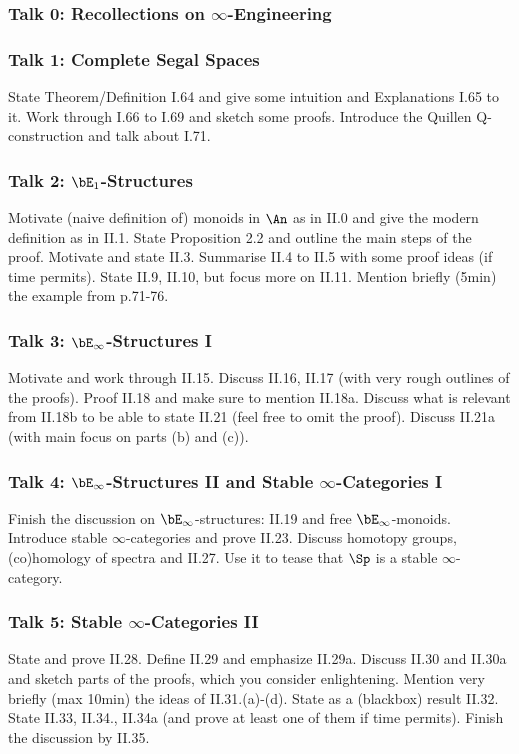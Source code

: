 \documentclass{article}
\begin{document}
\subsubsection*{Talk 0: Recollections on $\infty$-Engineering}


\subsubsection*{Talk 1: Complete Segal Spaces}
State Theorem/Definition I.64 and give some intuition and
Explanations I.65 to it.
Work through I.66 to I.69 and sketch some proofs.
Introduce the Quillen Q-construction and talk about I.71.

\subsubsection*{Talk 2: $\bE_1$-Structures}
Motivate (naive definition of) monoids in $\An$ as in II.0 and
give the modern definition as in II.1. State Proposition 2.2 and 
outline the main steps of the proof.
Motivate and state II.3. Summarise II.4 to II.5 with some proof ideas
(if time permits). State II.9, II.10, but focus more on II.11.
Mention briefly (5min) the example from p.71-76.


\subsubsection*{Talk 3: $\bE_\infty$-Structures I}
Motivate and work through II.15. Discuss II.16, II.17 (with very rough outlines
of the proofs). Proof II.18 and make sure to mention II.18a.
Discuss what is relevant from II.18b to be able to state II.21
(feel free to omit the proof). Discuss II.21a (with main focus on parts 
(b) and (c)).

\subsubsection*{Talk 4: $\bE_\infty$-Structures II and 
Stable $\infty$-Categories I}
Finish the discussion on $\bE_\infty$-structures: II.19 and free 
$\bE_\infty$-monoids.
Introduce stable $\infty$-categories and prove II.23. Discuss
homotopy groups, (co)homology of spectra and II.27. Use it to 
tease that $\Sp$ is a stable $\infty$-category.

\subsubsection*{Talk 5: Stable $\infty$-Categories II}
State and prove II.28. Define II.29 and emphasize II.29a.
Discuss II.30 and II.30a and sketch parts of the proofs, which you consider
enlightening. Mention very briefly (max 10min) the ideas of II.31.(a)-(d).
State as a (blackbox) result II.32. State II.33, II.34., II.34a 
(and prove at least one of them if time permits).
Finish the discussion by II.35.
\end{document}
